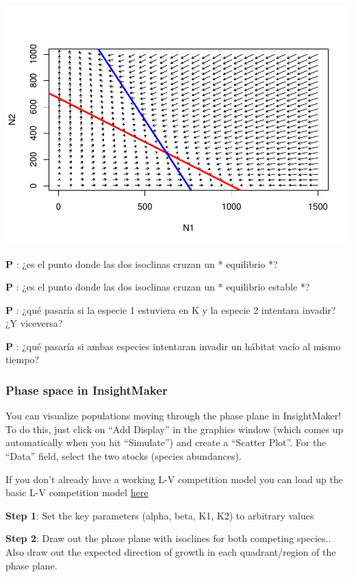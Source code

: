 \documentclass[
]{article}
\begin{document}
\includegraphics{LECTURE16_files/figure-latex/unnamed-chunk-16-1.pdf}

\textbf{P }: ¿es el punto donde las dos isoclinas cruzan un * equilibrio
*?

\textbf{P }: ¿es el punto donde las dos isoclinas cruzan un * equilibrio
estable *?

\textbf{P }: ¿qué pasaría si la especie 1 estuviera en K y la especie 2
intentara invadir? ¿Y viceversa?

\textbf{P }: ¿qué pasaría si ambas especies intentaran invadir un
hábitat vacío al mismo tiempo?

\hypertarget{phase-space-in-insightmaker}{%
\subsubsection{Phase space in
InsightMaker}\label{phase-space-in-insightmaker}}

You can visualize populations moving through the phase plane in
InsightMaker! To do this, just click on ``Add Display'' in the graphics
window (which comes up automatically when you hit ``Simulate'') and
create a ``Scatter Plot''. For the ``Data'' field, select the two stocks
(species abundances).

If you don't already have a working L-V competition model you can load
up the basic L-V competition model
\href{https://insightmaker.com/insight/77730/Competition-1\#}{here}

\textbf{Step 1}: Set the key parameters (alpha, beta, K1, K2) to
arbitrary values

\textbf{Step 2}: Draw out the phase plane with isoclines for both
competing species.. Also draw out the expected direction of growth in
each quadrant/region of the phase plane.
\end{document}
